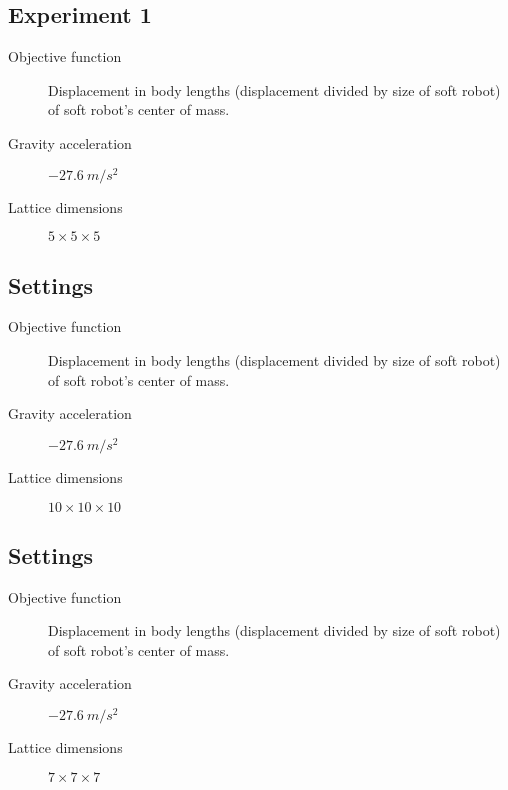 \subsection{Experiment 1}
\label{Settings1}
\begin{small}
\begin{description}
\item[Objective function]{Displacement in body lengths (displacement divided by size of soft robot) of soft robot's center of mass.}
\item[Gravity acceleration]{$-27.6\ m/s^2$}
\item[Lattice dimensions]{$5 \times 5 \times 5$}
\end{description}
\end{small}

\subsection{Settings}
\label{Settings2}
\begin{small}
\begin{description}
\item[Objective function]{Displacement in body lengths (displacement divided by size of soft robot) of soft robot's center of mass.}
\item[Gravity acceleration]{$-27.6\ m/s^2$}
\item[Lattice dimensions]{$10 \times 10 \times 10$}
\end{description}
\end{small}

\subsection{Settings}
\label{Settings3}
\begin{small}
\begin{description}
\item[Objective function]{Displacement in body lengths (displacement divided by size of soft robot) of soft robot's center of mass.}
\item[Gravity acceleration]{$-27.6\ m/s^2$}
\item[Lattice dimensions]{$7 \times 7 \times 7$}
\end{description}
\end{small}







